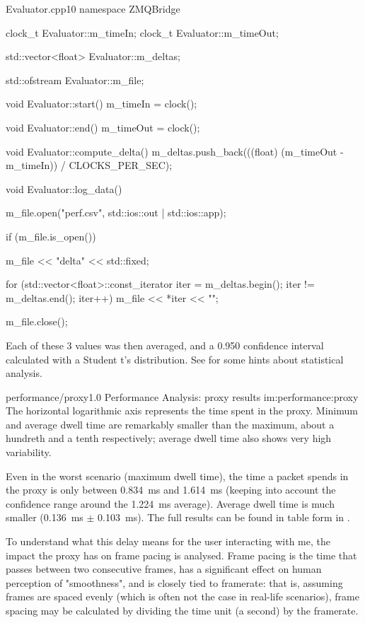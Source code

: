 \begin{codelist}{Evaluator.cpp}{10}
namespace ZMQBridge {

clock_t Evaluator::m_timeIn;
clock_t Evaluator::m_timeOut;

std::vector<float> Evaluator::m_deltas;

std::ofstream Evaluator::m_file;

void Evaluator::start() {
    m_timeIn = clock();
}

void Evaluator::end() {
    m_timeOut = clock();
}

void Evaluator::compute_delta() {
    m_deltas.push_back(((float) (m_timeOut - m_timeIn)) / CLOCKS_PER_SEC);
}

void Evaluator::log_data() {
    m_file.open("perf.csv", std::ios::out | std::ios::app);

    if (m_file.is_open()) {
        m_file << "delta\n"
               << std::fixed;

        for (std::vector<float>::const_iterator iter = m_deltas.begin(); iter != m_deltas.end(); iter++) {
            m_file << *iter << "\n";
        }
    }

    m_file.close();
}

}
\end{codelist}

\FLOATnoindent Each of these \num{3} values was then averaged, and a \num{0,950} confidence interval calculated with a Student t's distribution. See  for some hints about statistical analysis.

\begin{image}
	{performance/proxy}{1.0}
	{Performance Analysis: proxy results}
	{im:performance:proxy}
	{}
	{The horizontal logarithmic axis represents the time spent in the \gls{proxy}. Minimum and average dwell time are remarkably smaller than the maximum, about a hundreth and a tenth respectively; average dwell time also shows very high variability.}
\end{image}

Even in the worst scenario (maximum dwell time), the time a \gls{packet} spends in the \gls{proxy} is only between \SI{0,834}{\milli\second} and \SI{1,614}{\milli\second} (keeping into account the confidence range around the \SI{1,224}{\milli\second} average). Average dwell time is much smaller (\SI{0,136}{\milli\second} $\pm$ \SI{0,103}{\milli\second}).  The full results can be found in table form in .

To understand what this delay means for the user interacting with \gls{me}, the impact the \gls{proxy} has on frame pacing is analysed. Frame pacing is the time that passes between two consecutive frames, has a significant effect on human perception of "smoothness", and is closely tied to \gls{framerate}: that is, assuming frames are spaced evenly (which is often not the case in real-life scenarios), frame spacing may be calculated by dividing the time unit (a second) by the \gls{framerate}.


